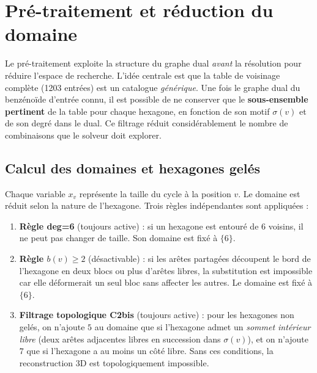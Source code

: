 \section{Pré-traitement et réduction du domaine}

Le pré-traitement exploite la structure du graphe dual \textit{avant} la résolution pour
réduire l'espace de recherche. L'idée centrale est que la table de voisinage complète (1203
entrées) est un catalogue \textit{générique}. Une fois le graphe dual du benzénoïde d'entrée
connu, il est possible de ne conserver que le \textbf{sous-ensemble pertinent} de la table pour
chaque hexagone, en fonction de son motif $\sigma(v)$ et de son degré dans le dual. Ce filtrage
réduit considérablement le nombre de combinaisons que le solveur doit explorer.

\subsection{Calcul des domaines et hexagones gelés}

Chaque variable $x_v$ représente la taille du cycle à la position $v$. Le domaine est réduit
selon la nature de l'hexagone. Trois règles indépendantes sont appliquées :

\begin{enumerate}
  \item \textbf{Règle deg=6} (toujours active) : si un hexagone est entouré de 6 voisins,
    il ne peut pas changer de taille. Son domaine est fixé à $\{6\}$.
  \item \textbf{Règle $b(v) \geq 2$} (désactivable) : si les arêtes partagées découpent le
    bord de l'hexagone en deux blocs ou plus d'arêtes libres, la substitution est impossible
    car elle déformerait un seul bloc sans affecter les autres. Le domaine est fixé à $\{6\}$.
  \item \textbf{Filtrage topologique C2bis} (toujours active) : pour les hexagones non
    gelés, on n'ajoute $5$ au domaine que si l'hexagone admet un \emph{sommet intérieur
    libre} (deux arêtes adjacentes libres en succession dans $\sigma(v)$), et on n'ajoute
    $7$ que si l'hexagone a au moins un côté libre. Sans ces conditions, la reconstruction
    3D est topologiquement impossible.
\end{enumerate}


